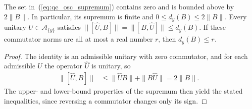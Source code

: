 \begin{lemma}
    \label{thm:qc_site_oscillation_bounds}
    \leanok
    The set in~(\ref{eq:qc_osc_supremum}) contains zero and is bounded
    above by $2\|B\|$. In particular, its supremum is finite and
    $0\le d_y(B)\le2\|B\|$. Every unitary $U\in\mathcal A_{\{y\}}$
    satisfies $\|[\widehat U,B]\|=\|[B,\widehat U]\|\le d_y(B)$.
    If these commutator norms are all at most a real number $r$, then
    $d_y(B)\le r$.
\end{lemma}
\begin{proof}
    \leanok
    The identity is an admissible unitary with zero commutator, and for each
    admissible $U$ the operator $\widehat U$ is unitary, so
    \begin{align}
        \|[\widehat U,B]\|
         & \le\|\widehat UB\|+\|B\widehat U\|=2\|B\|.
        \label{eq:qc_osc_commutator_bound}
    \end{align}
    The upper- and lower-bound properties of the supremum then yield the
    stated inequalities, since reversing a commutator changes only its sign.
\end{proof}

